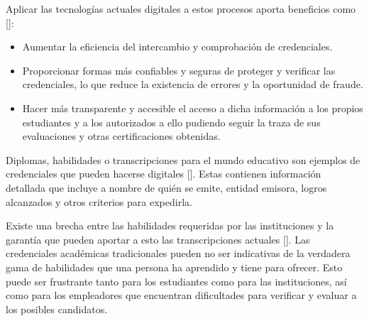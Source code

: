 Aplicar las tecnologías actuales digitales a estos procesos aporta beneficios como [\cite{3,4}]: 
\begin{itemize}
\item Aumentar la eficiencia del intercambio y comprobación de credenciales.
\item Proporcionar formas más confiables y seguras de proteger y verificar las credenciales, lo que reduce la existencia de errores y la oportunidad de fraude.
\item Hacer más transparente y accesible el acceso a dicha información a los propios estudiantes y a los autorizados a ello pudiendo seguir la traza de sus evaluaciones y otras certificaciones obtenidas.
\end{itemize}

Diplomas, habilidades o transcripciones para el mundo educativo son ejemplos de credenciales que pueden hacerse digitales [\cite{68}]. Estas contienen información detallada que incluye a nombre de quién se emite, entidad emisora, logros alcanzados y otros criterios para expedirla.


Existe una brecha entre las habilidades requeridas por las instituciones y la garantía que pueden aportar a esto las transcripciones actuales [\cite{4,68,69}]. Las credenciales académicas tradicionales pueden no ser indicativas de la verdadera gama de habilidades que una persona ha aprendido y tiene para ofrecer. Esto puede ser frustrante tanto para los estudiantes como para las instituciones, así como para los empleadores que encuentran dificultades para verificar y evaluar a los posibles candidatos.


